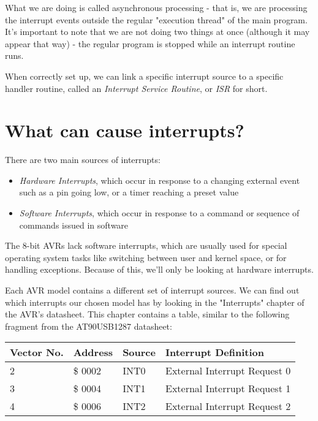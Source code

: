 \documentclass[a4paper,oneside]{book}
\begin{document}
What we are doing is called asynchronous processing - that is, we are processing the interrupt events outside the regular "execution thread" of the main program. It's important to note that we are not doing two things at once (although it may appear that way) - the regular program is stopped while an interrupt routine runs.

When correctly set up, we can link a specific interrupt source to a specific handler routine, called an \textit{Interrupt Service Routine}, or \textit{ISR} for short.


\label{chp:InterruptCauses}
\chapter{What can cause interrupts?}

There are two main sources of interrupts:

\begin{itemize}
\item \textit{Hardware Interrupts}, which occur in response to a changing external event such as a pin going low, or a timer reaching a preset value
\item \textit{Software Interrupts}, which occur in response to a command or sequence of commands issued in software
\end{itemize}

The 8-bit AVRs lack software interrupts, which are usually used for special operating system tasks like switching between user and kernel space, or for handling exceptions. Because of this, we'll only be looking at hardware interrupts.

Each AVR model contains a different set of interrupt sources. We can find out which interrupts our chosen model has by looking in the "Interrupts" chapter of the AVR's datasheet. This chapter contains a table, similar to the following fragment from the AT90USB1287 datasheet: 

\begin{center}
\begin{tabular}{|l|l|l|l|}
	\hline
	Vector No. & Address & Source & Interrupt Definition \\
	\hline
	2          & \$ 0002   & INT0   & External Interrupt Request 0 \\
	3          & \$ 0004   & INT1   & External Interrupt Request 1 \\
	4          & \$ 0006   & INT2   & External Interrupt Request 2 \\
	\hline
\end{tabular}
\end{center}
\end{document}
